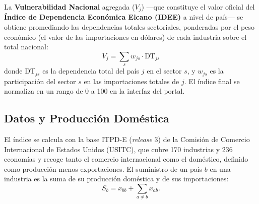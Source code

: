 \documentclass[final,1p,times,authoryear]{elsarticle}
\begin{document}
La \textbf{Vulnerabilidad Nacional} agregada ($V_j$) ---que constituye el valor oficial del \textbf{Índice de Dependencia Económica Elcano (IDEE)} a nivel de país--- se obtiene promediando las dependencias totales sectoriales, ponderadas por el peso económico (el valor de las importaciones en dólares) de cada industria sobre el total nacional:
\begin{equation}
V_j = \sum_{s} w_{js} \cdot \text{DT}_{js}
\end{equation}
donde $\text{DT}_{js}$ es la dependencia total del país $j$ en el sector $s$, y $w_{js}$ es la participación del sector $s$ en las importaciones totales de $j$. El índice final se normaliza en un rango de 0 a 100 en la interfaz del portal.

\subsection{Datos y Producción Doméstica}\label{subsec:datos}
El índice se calcula con la base ITPD-E (\textit{release} 3) de la Comisión de Comercio Internacional de Estados Unidos (USITC), que cubre 170 industrias y 236 economías y recoge tanto el comercio internacional como el doméstico, definido como producción menos exportaciones. El suministro de un país $b$ en una industria es la suma de su producción doméstica y de sus importaciones:
\begin{equation}
S_b = x_{bb} + \sum_{a \neq b} x_{ab}.
\end{equation}
\end{document}
